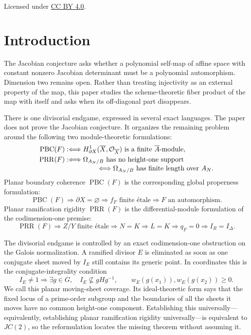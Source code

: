 \documentclass[11pt]{article}
\theoremstyle{remark}
\theoremstyle{definition}
\begin{document}
\begin{center}
  \small Licensed under
  \href{https://creativecommons.org/licenses/by/4.0/}
    {CC BY 4.0}.
\end{center}

\tableofcontents

\section{Introduction}
\label{sec:introduction}

The Jacobian conjecture asks whether a polynomial self-map of affine space
with constant nonzero Jacobian determinant must be a polynomial
automorphism.  Dimension two remains open.  Rather than treating
injectivity as an external property of the map, this paper studies the
scheme-theoretic fiber product of the map with itself and asks when its
off-diagonal part disappears.

There is one divisorial endgame, expressed in several exact languages.  The
paper does not prove the Jacobian conjecture.  It organizes the remaining
problem around the following two module-theoretic formulations:
\[
  \begin{aligned}
  \operatorname{PBC}(F)
    &:\Longleftrightarrow
      H^1_{\partial X}(\overline X,\mathcal O_{\overline X})
      \text{ is a finite }\overline A\text{-module},\\
  \operatorname{PRR}(F)
    &:\Longleftrightarrow
      \Omega_{A_N/B}\text{ has no height-one support}\notag\\[-2pt]
    &\hspace{4.7em}\Longleftrightarrow
      \Omega_{A_N/B}\text{ has finite length over }A_N.
  \end{aligned}
\]
Planar boundary coherence \(\operatorname{PBC}(F)\) is the corresponding
global properness formulation:
\[
  \operatorname{PBC}(F)
  \Longrightarrow \partial X=\varnothing
  \Longrightarrow f_F\text{ finite \'etale}
  \Longrightarrow F\text{ an automorphism}.
\]
Planar ramification rigidity \(\operatorname{PRR}(F)\) is the
differential-module formulation of the codimension-one premise:
\[
  \operatorname{PRR}(F)
  \Longrightarrow Z/Y\text{ finite \'etale}
  \Longrightarrow N=K
  \Longrightarrow L=K
  \Longrightarrow q_F=0
  \Longrightarrow I_R=I_\Delta.
\]

The divisorial endgame is controlled by an exact codimension-one obstruction on
the Galois normalization.  A ramified divisor \(E\) is eliminated as soon
as one conjugate sheet moved by \(I_E\) still contains its generic point.
In coordinates this is the conjugate-integrality condition
\[
  I_E\neq1
  \Longrightarrow
  \exists g\in G,\quad
  I_E\nsubseteq gHg^{-1},\qquad
  w_E(g(x_1)),w_E(g(x_2))\geq0.
\]
We call this planar moving-sheet coverage.  Its ideal-theoretic form says
that the fixed locus of a prime-order subgroup and the boundaries of all
the sheets it moves have no common height-one component.  Establishing
this universally---equivalently, establishing planar ramification rigidity
universally---is equivalent to \(JC(2)\), so the reformulation locates the
missing theorem without assuming it.
\end{document}
